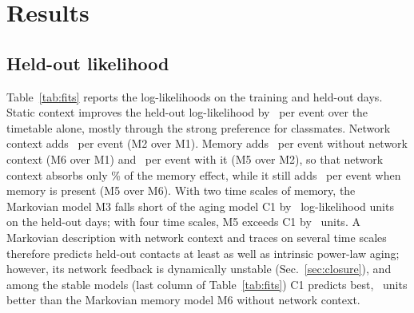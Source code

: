 \section{Results}\label{sec:results}

\subsection{Held-out likelihood}
Table~\ref{tab:fits} reports the log-likelihoods on the training and held-out days.
Static context improves the held-out log-likelihood by \GainStatic\ per event over the timetable alone, mostly through the strong preference for classmates.
Network context adds \GainNetwork\ per event (M2 over M1).
Memory adds \GainMemoryAlone\ per event without network context (M6 over M1) and \GainMemoryWithNetwork\ per event with it (M5 over M2), so that network context absorbs only \MemoryAbsorbed\% of the memory effect, while it still adds \GainNetworkWithMemory\ per event when memory is present (M5 over M6).
With two time scales of memory, the Markovian model M3 falls short of the aging model C1 by \ConeOverMthree\ log-likelihood units on the held-out days; with four time scales, M5 exceeds C1 by \MfiveOverCone\ units.
A Markovian description with network context and traces on several time scales therefore predicts held-out contacts at least as well as intrinsic power-law aging; however, its network feedback is dynamically unstable (Sec.~\ref{sec:closure}), and among the stable models (last column of Table~\ref{tab:fits}) C1 predicts best, \ConeOverMsix\ units better than the Markovian memory model M6 without network context.

\begin{table}[t]
\caption{Log-likelihoods $L$ on the training days (Monday to Wednesday) and the held-out days (Thursday and Friday), held-out improvement per event relative to M1, the Kolmogorov--Smirnov distance (KS) of the time-rescaled contact durations on the held-out days from the unit exponential distribution (zero for a correct model), and whether simulations of the fitted model stay sparse (Sec.~\ref{sec:closure}).}
\label{tab:fits}

\end{table}

